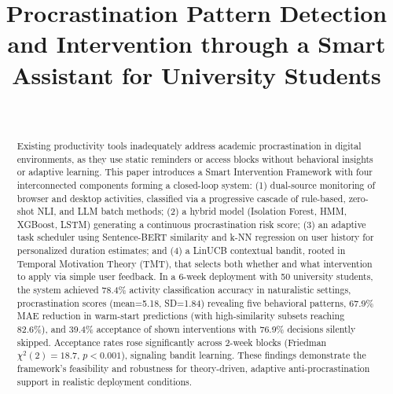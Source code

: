 \documentclass[conference]{IEEEtran}
\begin{document}
\title{Procrastination Pattern Detection and Intervention through a Smart Assistant for University Students}

\author{
\\[1em]
}

\maketitle

\begin{abstract}
Existing productivity tools inadequately address academic procrastination in digital environments, as they use static reminders or access blocks without behavioral insights or adaptive learning. This paper introduces a Smart Intervention Framework with four interconnected components forming a closed-loop system: (1) dual-source monitoring of browser and desktop activities, classified via a progressive cascade of rule-based, zero-shot NLI, and LLM batch methods; (2) a hybrid model (Isolation Forest, HMM, XGBoost, LSTM) generating a continuous procrastination risk score; (3) an adaptive task scheduler using Sentence-BERT similarity and k-NN regression on user history for personalized duration estimates; and (4) a LinUCB contextual bandit, rooted in Temporal Motivation Theory (TMT), that selects both whether and what intervention to apply via simple user feedback. In a 6-week deployment with 50 university students, the system achieved 78.4\% activity classification accuracy in naturalistic settings, procrastination scores (mean=5.18, SD=1.84) revealing five behavioral patterns, 67.9\% MAE reduction in warm-start predictions (with high-similarity subsets reaching 82.6\%), and 39.4\% acceptance of shown interventions with 76.9\% decisions silently skipped. Acceptance rates rose significantly across 2-week blocks (Friedman $\chi^2(2) = 18.7$, $p < 0.001$), signaling bandit learning. These findings demonstrate the framework's feasibility and robustness for theory-driven, adaptive anti-procrastination support in realistic deployment conditions.
\end{abstract}
\end{document}
